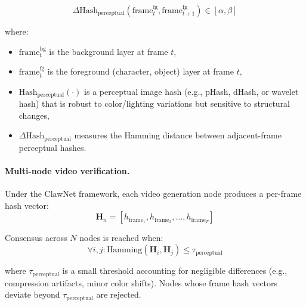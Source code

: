 \documentclass[11pt,a4paper]{article}
\begin{document}
\begin{equation}
    \Delta\text{Hash}_{\text{perceptual}}(\text{frame}_t^{\text{fg}},
    \text{frame}_{t+1}^{\text{fg}}) \in [\alpha, \beta]
\end{equation}

\noindent where:
\begin{itemize}
    \item $\text{frame}_t^{\text{bg}}$ is the background layer at
          frame $t$,
    \item $\text{frame}_t^{\text{fg}}$ is the foreground (character,
          object) layer at frame $t$,
    \item $\text{Hash}_{\text{perceptual}}(\cdot)$ is a perceptual
          image hash (e.g., pHash, dHash, or wavelet hash) that is
          robust to color/lighting variations but sensitive to structural
          changes,
    \item $\Delta\text{Hash}_{\text{perceptual}}$ measures the
          Hamming distance between adjacent-frame perceptual hashes.
\end{itemize}

\paragraph{Multi-node video verification.}
Under the ClawNet framework, each video generation node produces a
per-frame hash vector:
\begin{equation}
    \mathbf{H}_n = [h_{\text{frame}_1}, h_{\text{frame}_2}, \ldots,
    h_{\text{frame}_T}]
\end{equation}

Consensus across $N$ nodes is reached when:
\begin{equation}
    \forall i,j : \text{Hamming}(\mathbf{H}_i, \mathbf{H}_j) \leq
    \tau_{\text{perceptual}}
\end{equation}

\noindent where $\tau_{\text{perceptual}}$ is a small threshold
accounting for negligible differences (e.g., compression artifacts,
minor color shifts). Nodes whose frame hash vectors deviate beyond
$\tau_{\text{perceptual}}$ are rejected.
\end{document}
